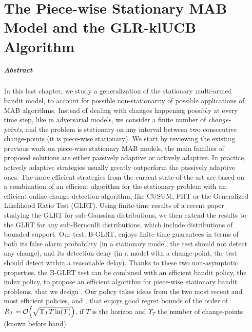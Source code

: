 

\chapter{The Piece-wise Stationary MAB Model and the GLR-klUCB Algorithm}
\label{chapter:6}
\minitoc

\paragraph{Abstract}

In this last chapter, we study a generalization of the stationary multi-armed bandit model,
to account for possible non-stationarity of possible applications of MAB algorithms.
Instead of dealing with changes happening possibly at every time step, like in adversarial models, we consider a finite number of \emph{change-points}, and the problem is stationary on any interval between two consecutive change-points (it is piece-wise stationary).
%
We start by reviewing the existing previous work on piece-wise stationary MAB models, the main families of proposed solutions are either passively adaptive or actively adaptive. In practice, actively adaptive strategies usually greatly outperform the passively adaptive ones.
The more efficient strategies from the current state-of-the-art are based on a combination of an efficient algorithm for the stationary problem with an efficient online change detection algorithm, like CUSUM, PHT or the Generalized Likelihood Ratio Test (GLRT).
Using finite-time results of a recent paper studying the GLRT for sub-Gaussian distributions, we then extend the results to the GLRT for any sub-Bernoulli distributions, which include distributions of bounded support. Our test, B-GLRT, enjoys finite-time guarantees in terms of both its false alarm probability (in a stationary model, the test should not detect any change), and its detection delay (in a model with a change-point, the test should detect within a reasonable delay).
%
Thanks to these two non-asymptotic properties, the B-GLRT test can be combined with an efficient bandit policy, the \klUCB{} index policy, to propose an efficient algorithm for piece-wise stationary bandit problems, that we design \GLRklUCB.
Our policy takes ideas from the two most recent and most efficient policies, \CUSUMUCB{} and \MUCB, that enjoys good regret bounds of the order of $R_T = \mathop{}\mathopen{}\mathcal{O}\mathopen{}\left(\sqrt{\Upsilon_T T \ln(T)}\right)$, if $T$ is the horizon and $\Upsilon_T$ the number of change-points (known before hand).
